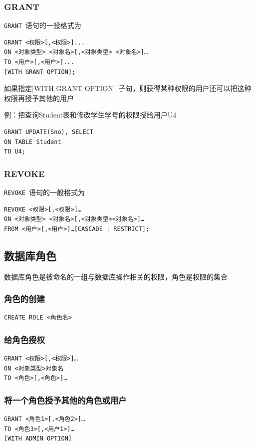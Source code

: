 \subsubsection{GRANT}
\verb|GRANT|\ 语句的一般格式为
\begin{lstlisting}
GRANT <权限>[,<权限>]... 
ON <对象类型> <对象名>[,<对象类型> <对象名>]…
TO <用户>[,<用户>]...
[WITH GRANT OPTION];
\end{lstlisting}

如果指定\sverb|WITH GRANT OPTION|\ 子句，则获得某种权限的用户还可以把这种权限再授予其他的用户

例：把查询Student表和修改学生学号的权限授给用户U4
\begin{lstlisting}
GRANT UPDATE(Sno), SELECT 
ON TABLE Student 
TO U4;
\end{lstlisting}

\subsubsection{REVOKE}
\verb|REVOKE|\ 语句的一般格式为
\begin{lstlisting}
REVOKE <权限>[,<权限>]…
ON <对象类型> <对象名>[,<对象类型><对象名>]…
FROM <用户>[,<用户>]…[CASCADE | RESTRICT];
\end{lstlisting}

\subsection{数据库角色}
数据库角色是被命名的一组与数据库操作相关的权限，角色是权限的集合

\subsubsection{角色的创建}
\begin{lstlisting}
CREATE ROLE <角色名>
\end{lstlisting}

\subsubsection{给角色授权}
\begin{lstlisting}
GRANT <权限>[,<权限>]… 
ON <对象类型>对象名  
TO <角色>[,<角色>]…   
\end{lstlisting}

\subsubsection{将一个角色授予其他的角色或用户}
\begin{lstlisting}
GRANT <角色1>[,<角色2>]…
TO <角色3>[,<用户1>]… 
[WITH ADMIN OPTION]
\end{lstlisting}

